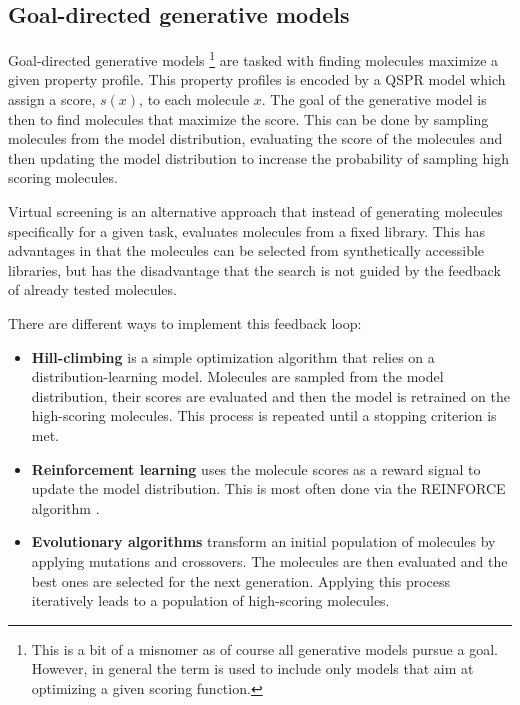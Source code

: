 \subsection{Goal-directed generative models\label{sec:eval-gen}}

Goal-directed generative models
\footnote{This is a bit of a misnomer as of course all generative models pursue
a goal. However, in general the term is used to include only models that aim 
at optimizing a given scoring function.
}
are tasked with finding molecules maximize 
a given property profile. This property profiles is encoded by a
\ac{QSPR} model which assign a score, $s(x)$, to each molecule $x$.
The goal of the generative model is then to find molecules that maximize the
score. This can be done by sampling molecules from the model distribution, 
evaluating the score of the molecules and then updating the model distribution
to increase the probability of sampling high scoring molecules. 

Virtual screening is an alternative approach that instead of 
generating molecules specifically for a given task, evaluates 
molecules from a fixed library. This has advantages in that 
the molecules can be selected from synthetically accessible
libraries, but has the disadvantage that the search is not
guided by the feedback of already tested molecules.

There are different ways to implement this feedback loop:
\begin{itemize}
    \item \textbf{Hill-climbing} is a simple optimization algorithm that 
    relies on a distribution-learning model. Molecules are sampled from the
    model distribution, their scores are evaluated and then the model 
    is retrained on the high-scoring molecules. This process is repeated
    until a stopping criterion is met.
    \item \textbf{Reinforcement learning} uses the molecule scores as a reward
    signal to update the model distribution. This is most often done via 
    the REINFORCE algorithm \citep{williamsSimpleStatisticalGradientfollowing1992}.
    \item \textbf{Evolutionary algorithms} transform an initial population of
    molecules by applying mutations and crossovers. The molecules are then
    evaluated and the best ones are selected for the next generation. 
    Applying this process iteratively leads to a population of high-scoring 
    molecules.
\end{itemize}


